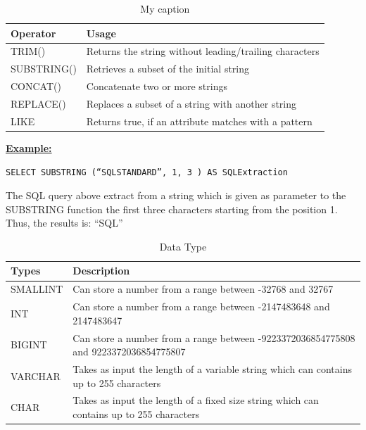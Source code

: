 \begin{table}[h]
\centering
\caption{My caption}
\label{my-label}
\begin{tabular}{|p{2cm}|p{11.5cm}| }
\hline
\textbf{Operator} & \textbf{Usage}                                         \\ \hline
TRIM()            & Returns the string without leading/trailing characters \\ \hline
SUBSTRING()       & Retrieves a subset of the initial string               \\ \hline
CONCAT()          & Concatenate two or more strings                        \\ \hline
REPLACE()         & Replaces a subset of a string with another string      \\ \hline
LIKE              & Returns true, if an attribute matches with a pattern   \\ \hline
\end{tabular}
\end{table}


\noindent\textbf{\underline{Example:}}
\begin{mdframed}[backgroundcolor=lightgray!20] 
\begin{lstlisting}[style=SQL]
SELECT SUBSTRING (“SQLSTANDARD”, 1, 3 ) AS SQLExtraction 
\end{lstlisting}
\end{mdframed}

The SQL query above extract from a string which is given as parameter to the SUBSTRING function the first three characters starting from the position 1. Thus, the results is: “SQL”

\begin{table}[h]
\centering
\caption{Data Type}
\begin{tabular}{|p{2cm}|p{11.5cm}| }
\hline
\textbf{Types} & \textbf{Description}                                                                     \\ \hline
SMALLINT       & Can store a number from a range between -32768 and 32767                                 \\ \hline
INT            & Can store a number from a range between -2147483648 and 2147483647                       \\ \hline
BIGINT         & Can store a number from a range between -9223372036854775808 and 9223372036854775807     \\ \hline
VARCHAR        & Takes as input the length of a variable string which can contains up to 255 characters   \\ \hline
CHAR           & Takes as input the length of a fixed size string which can contains up to 255 characters \\ \hline
\end{tabular}
\end{table}



